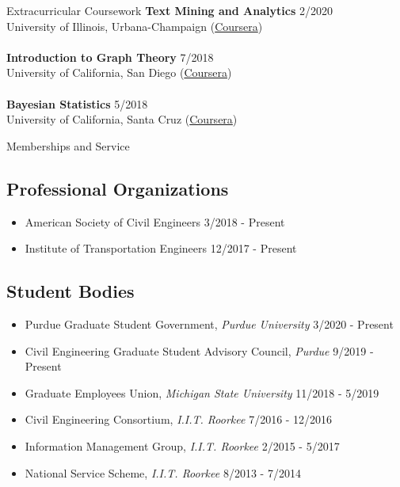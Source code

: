 \documentclass{resume} %
\begin{document}
\begin{rSection}{Extracurricular Coursework}
    \textbf{Text Mining and Analytics} \hfill 2/2020
    \\ University of Illinois, Urbana-Champaign (\href{https://coursera.org/share/7eac25e880771bf576b661324a4d79be}{Coursera}) \\
    \\ \textbf{Introduction to Graph Theory} \hfill 7/2018
    \\ University of California, San Diego (\href{https://coursera.org/share/97583460aa0510f570f971844f19d16b}{Coursera}) \\
    \\ \textbf{Bayesian Statistics} \hfill 5/2018
    \\ University of California, Santa Cruz (\href{https://coursera.org/share/8d0b0387400c53f13a7ce2b2b81153fc}{Coursera}) 
\end{rSection}

\begin{rSection}{Memberships and Service}
    \subsection*{Professional Organizations}
    \begin{itemize}
        \item American Society of Civil Engineers \hfill 3/2018 - Present
        \item Institute of Transportation Engineers \hfill 12/2017 - Present
    \end{itemize}
    \subsection*{Student Bodies}
    \begin{itemize}
        \item Purdue Graduate Student Government, \textit{Purdue University} \hfill 3/2020 - Present
        \item Civil Engineering Graduate Student Advisory Council, \textit{Purdue} \hfill 9/2019 - Present
        \item Graduate Employees Union, \textit{Michigan State University} \hfill 11/2018 - 5/2019
        \item Civil Engineering Consortium, \textit{I.I.T. Roorkee} \hfill 7/2016 - 12/2016
        \item Information Management Group, \textit{I.I.T. Roorkee} \hfill 2/2015 - 5/2017
        \item National Service Scheme, \textit{I.I.T. Roorkee} \hfill 8/2013 - 7/2014
    \end{itemize}
\end{rSection}
\end{document}
